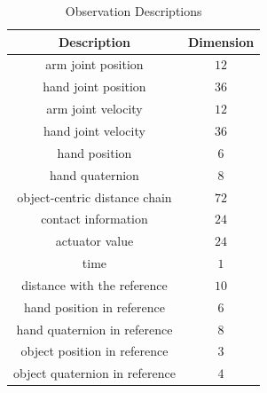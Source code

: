 \begin{table}[h]
    \centering
    \caption{Observation Descriptions}
    \begin{tabular}{c|c}
    \hline
    Description & Dimension \\
    \hline
        arm joint position  & $12$ \\
        hand joint position & $36$ \\
        arm joint velocity & $12$ \\
        hand joint velocity & $36$ \\
        hand position & $6$ \\
        hand quaternion & $8$ \\
        object-centric distance chain & $72$ \\
        contact information & $24$ \\
        actuator value & $24$ \\
        time & $1$ \\
        distance with the reference  & $10$ \\
        hand position in reference & $6$ \\
        hand quaternion in reference & $8$ \\
        object position in reference & $3$ \\
        object quaternion in reference & $4$ \\

    \end{tabular}
    \label{table:obs_all}
\end{table}